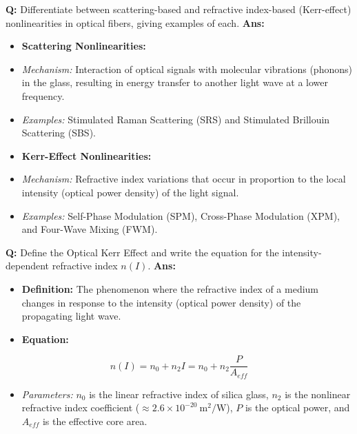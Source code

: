 \documentclass[10pt,a4paper,twocolumn]{article}
\begin{document}
\begin{tcolorbox}[
  colback=white,
  colframe=UnitColorSix,
  colbacktitle=gray!10!white,
  coltitle=black,
  fonttitle=\bfseries\sffamily\small,
  title={Unit VI $\bullet$ Card 1: Scattering vs. Kerr-Effect Nonlinearities},
  boxrule=1.2pt,
  arc=2mm,
  outer arc=2mm,
  boxsep=1.5mm,
  top=1mm,
  bottom=1mm,
  left=1.5mm,
  right=1.5mm,
  before skip=2.5mm,
  after skip=2.5mm
]
\textbf{Q:} Differentiate between scattering-based and refractive index-based (Kerr-effect) nonlinearities in optical fibers, giving examples of each.
\tcbline
\textbf{Ans:} \begin{itemize}
  \item   \textbf{Scattering Nonlinearities:}
  \item   \textit{Mechanism:} Interaction of optical signals with molecular vibrations (phonons) in the glass, resulting in energy transfer to another light wave at a lower frequency.
  \item   \textit{Examples:} Stimulated Raman Scattering (SRS) and Stimulated Brillouin Scattering (SBS).
  \item   \textbf{Kerr-Effect Nonlinearities:}
  \item   \textit{Mechanism:} Refractive index variations that occur in proportion to the local intensity (optical power density) of the light signal.
  \item   \textit{Examples:} Self-Phase Modulation (SPM), Cross-Phase Modulation (XPM), and Four-Wave Mixing (FWM).
\end{itemize}
\end{tcolorbox}


\begin{tcolorbox}[
  colback=white,
  colframe=UnitColorSix,
  colbacktitle=gray!10!white,
  coltitle=black,
  fonttitle=\bfseries\sffamily\small,
  title={Unit VI $\bullet$ Card 2: Optical Kerr Effect},
  boxrule=1.2pt,
  arc=2mm,
  outer arc=2mm,
  boxsep=1.5mm,
  top=1mm,
  bottom=1mm,
  left=1.5mm,
  right=1.5mm,
  before skip=2.5mm,
  after skip=2.5mm
]
\textbf{Q:} Define the Optical Kerr Effect and write the equation for the intensity-dependent refractive index $n(I)$.
\tcbline
\textbf{Ans:} \begin{itemize}
  \item   \textbf{Definition:} The phenomenon where the refractive index of a medium changes in response to the intensity (optical power density) of the propagating light wave.
  \item   \textbf{Equation:}
\end{itemize}
        \[ n(I) = n_0 + n_2 I = n_0 + n_2 \frac{P}{A_{eff}} \]
\begin{itemize}
  \item   \textit{Parameters:} $n_0$ is the linear refractive index of silica glass, $n_2$ is the nonlinear refractive index coefficient ($\approx 2.6 \times 10^{-20}\ \text{m}^2/\text{W}$), $P$ is the optical power, and $A_{eff}$ is the effective core area.
\end{itemize}
\end{tcolorbox}
\end{document}
